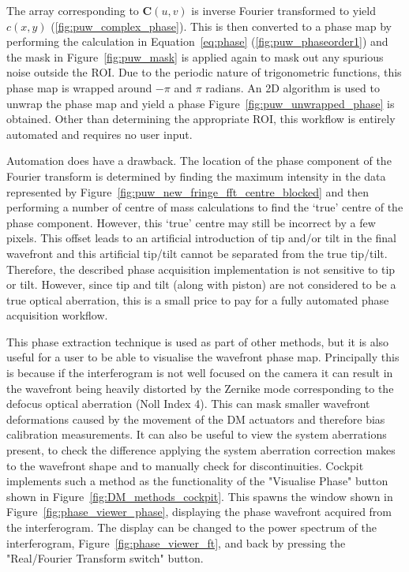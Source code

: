 The array corresponding to $\boldsymbol{C}(u,v)$ is inverse Fourier transformed to yield $c(x,y)$ (\ref{fig:puw_complex_phase}). This is then converted to a phase map by performing the calculation in Equation~\ref{eq:phase} (\ref{fig:puw_phaseorder1}) and the mask in Figure~\ref{fig:puw_mask} is applied again to mask out any spurious noise outside the ROI. Due to the periodic nature of trigonometric functions, this phase map is wrapped around $-\pi$ and $\pi$ radians. An 2D  algorithm is used to unwrap the phase map and yield a phase Figure~\ref{fig:puw_unwrapped_phase} is obtained\cite{herraez2002fast}. Other than determining the appropriate ROI, this workflow is entirely automated and requires no user input. 

Automation does have a drawback. The location of the phase component
of the Fourier transform is determined by finding the maximum
intensity in the data represented by
Figure~\ref{fig:puw_new_fringe_fft_centre_blocked} and then performing
a number of centre of mass calculations to find the `true' centre of
the phase component. However, this `true' centre may still be
incorrect by a few pixels. This offset leads to an artificial
introduction of tip and/or tilt in the final wavefront and this
artificial tip/tilt cannot be separated from the true
tip/tilt. Therefore, the described phase acquisition implementation is
not sensitive to tip or tilt. However, since tip and tilt (along with piston) are not considered to be a true optical aberration, this is a small price to pay for a fully automated phase acquisition workflow.

This phase extraction technique is used as part of other methods, but it is also useful for a user to be able to visualise the wavefront phase map. Principally this is because if the interferogram is not well focused on the camera it can result in the wavefront being heavily distorted by the Zernike mode corresponding to the defocus optical aberration (Noll Index 4). This can mask smaller wavefront deformations caused by the movement of the DM actuators and therefore bias calibration measurements. It can also be useful to view the system aberrations present, to check the difference applying the system aberration correction makes to the wavefront shape and to manually check for discontinuities. Cockpit implements such a method as the functionality of the "Visualise Phase" button shown in Figure~\ref{fig:DM_methods_cockpit}. This spawns the window shown in Figure~\ref{fig:phase_viewer_phase}, displaying the phase wavefront acquired from the interferogram. The display can be changed to the power spectrum of the interferogram, Figure~\ref{fig:phase_viewer_ft}, and back by pressing the "Real/Fourier Transform switch" button. 


